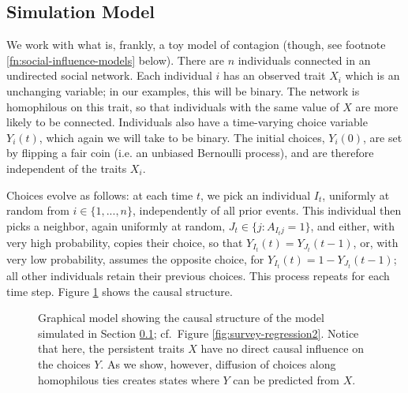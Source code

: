 \documentclass{article}
\begin{document}
\begin{multicols}{2}
\subsection{Simulation Model}
\label{sec:voter-model}

We work with what is, frankly, a toy model of contagion (though, see footnote
\ref{fn:social-influence-models} below).  There are $n$ individuals connected
in an undirected social network.  Each individual $i$ has an observed trait
$X_i$ which is an unchanging variable; in our examples, this will be binary.
The network is homophilous on this trait, so that individuals with the same
value of $X$ are more likely to be connected.  Individuals also have a
time-varying choice variable $Y_i(t)$, which again we will take to be
binary. The initial choices, $Y_i(0)$, are set by flipping a fair coin (i.e. an
unbiased Bernoulli process), and are therefore independent of the traits $X_i$.

Choices evolve as follows: at each time $t$, we pick an individual $I_t$,
uniformly at random from $i \in \{1, ..., n\}$, independently of all prior
events.  This individual then picks a neighbor, again uniformly at random, $J_t
\in \{j:A_{I_{t}j}=1\}$, and either, with very high probability, copies their
choice, so that $Y_{I_t}(t) = Y_{J_t}(t-1)$, or, with very low probability,
assumes the opposite choice, for $Y_{I_t}(t) = 1-Y_{J_t}(t-1)$; all other
individuals retain their previous choices. This process repeats for each time
step.  Figure \ref{fig:voter-model-graph} shows the causal structure.

\begin{figure}
\begin{center}
\end{center}
\caption{Graphical model showing the causal structure of the model simulated in
  Section \ref{sec:voter-model}; cf.\ Figure
  \ref{fig:survey-regression2}. Notice that here, the persistent traits $X$
  have no direct causal influence on the choices $Y$.  As we show, however,
  diffusion of choices along homophilous ties creates states where $Y$ can be
  predicted from $X$.}
\label{fig:voter-model-graph}
\end{figure}


\end{multicols}
\end{document}
